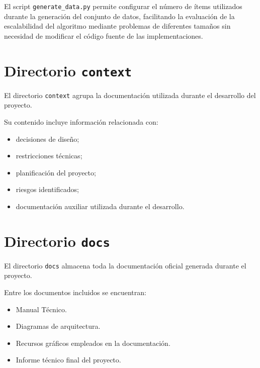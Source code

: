 El script \texttt{generate\_data.py} permite configurar el número de ítems utilizados durante la generación del conjunto de datos, facilitando la evaluación de la escalabilidad del algoritmo mediante problemas de diferentes tamaños sin necesidad de modificar el código fuente de las implementaciones.

\section{Directorio \texttt{context}}

El directorio \texttt{context} agrupa la documentación utilizada durante el desarrollo del proyecto.

Su contenido incluye información relacionada con:

\begin{itemize}

\item decisiones de diseño;

\item restricciones técnicas;

\item planificación del proyecto;

\item riesgos identificados;

\item documentación auxiliar utilizada durante el desarrollo.

\end{itemize}

\section{Directorio \texttt{docs}}

El directorio \texttt{docs} almacena toda la documentación oficial generada durante el proyecto.

Entre los documentos incluidos se encuentran:

\begin{itemize}

\item Manual Técnico.

\item Diagramas de arquitectura.

\item Recursos gráficos empleados en la documentación.

\item Informe técnico final del proyecto.

\end{itemize}

